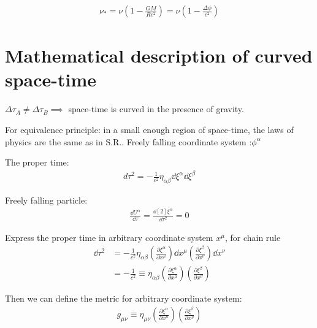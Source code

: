 \begin{align}
    \nu_{*}=\nu(1-\frac{GM}{Rc^{2}})=\nu(1-\frac{\Delta \phi}{c^{2}})
\end{align}

\section{Mathematical description of curved space-time}

$\Delta \tau_{A} \neq \Delta \tau_{B} \implies $ space-time is curved in the presence of gravity. 

For equivalence principle: in a small enough region of space-time, the laws of physics are the same as in S.R.. Freely falling coordinate system :$\phi^{\alpha}$

The proper time: 
\begin{align}
    d\tau^{2}=-\frac{1}{c^{2}}\eta_{\alpha \beta}\dd{\xi^{\alpha}} \dd{\xi^{\beta}}
\end{align}

Freely falling particle:
\begin{align}
    \frac{\dd{U^{\alpha}}}{\dd{\tau}}=\frac{\dd[2]{\xi^{\alpha}}}{\dd{\tau}^{2}}=0
\end{align}

Express the proper time in arbitrary coordinate system $x^{\mu}$, for chain rule
\begin{align}
    \dd\tau^{2}&=-\frac{1}{c^{2}}\eta_{\alpha \beta}\left(\frac{\partial \xi^{\alpha}}{\partial x^{\mu}}\right)\dd{x^{\mu}} \left(\frac{\partial \xi^{\beta}}{\partial x^{\nu}}\right)\dd{x^{\nu}}\\
    &=-\frac{1}{c^{2}}\equiv \eta_{\alpha\beta}\left(\frac{\partial \xi^{\alpha}}{\partial x^{\mu}}\right)\left(\frac{\partial \xi^{\beta}}{\partial x^{\nu}}\right)
\end{align}

Then we can define the metric for arbitrary coordinate system:
\begin{align}
    g_{\mu\nu}\equiv \eta_{\mu\nu}\left(\frac{\partial \xi^{\alpha}}{\partial x^{\mu}}\right)\left(\frac{\partial \xi^{\beta}}{\partial x^{\nu}}\right)
\end{align}


